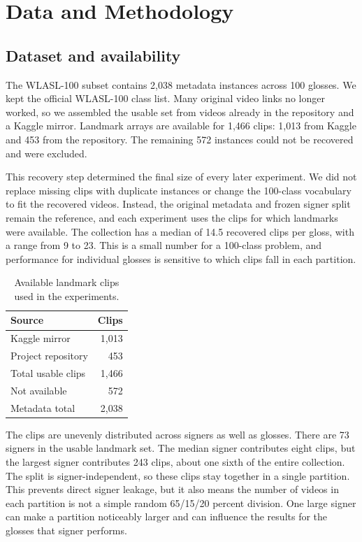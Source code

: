 \documentclass[12pt,a4paper,oneside]{report}
\begin{document}
\chapter{Data and Methodology}
\section{Dataset and availability}
The WLASL-100 subset contains 2,038 metadata instances across 100 glosses. We kept the official WLASL-100 class list. Many original video links no longer worked, so we assembled the usable set from videos already in the repository and a Kaggle mirror. Landmark arrays are available for 1,466 clips: 1,013 from Kaggle and 453 from the repository. The remaining 572 instances could not be recovered and were excluded.

This recovery step determined the final size of every later experiment. We did not replace missing clips with duplicate instances or change the 100-class vocabulary to fit the recovered videos. Instead, the original metadata and frozen signer split remain the reference, and each experiment uses the clips for which landmarks were available. The collection has a median of 14.5 recovered clips per gloss, with a range from 9 to 23. This is a small number for a 100-class problem, and performance for individual glosses is sensitive to which clips fall in each partition.

\begin{table}[H]
\centering
\label{tab:data}
\begin{tabular}{lr}
\toprule
Source & Clips \\
\midrule
Kaggle mirror & 1,013 \\
Project repository & 453 \\
Total usable clips & 1,466 \\
Not available & 572 \\
Metadata total & 2,038 \\
\bottomrule
\end{tabular}
\caption{Available landmark clips used in the experiments.}
\end{table}

The clips are unevenly distributed across signers as well as glosses. There are 73 signers in the usable landmark set. The median signer contributes eight clips, but the largest signer contributes 243 clips, about one sixth of the entire collection. The split is signer-independent, so these clips stay together in a single partition. This prevents direct signer leakage, but it also means the number of videos in each partition is not a simple random 65/15/20 percent division. One large signer can make a partition noticeably larger and can influence the results for the glosses that signer performs.
\end{document}
